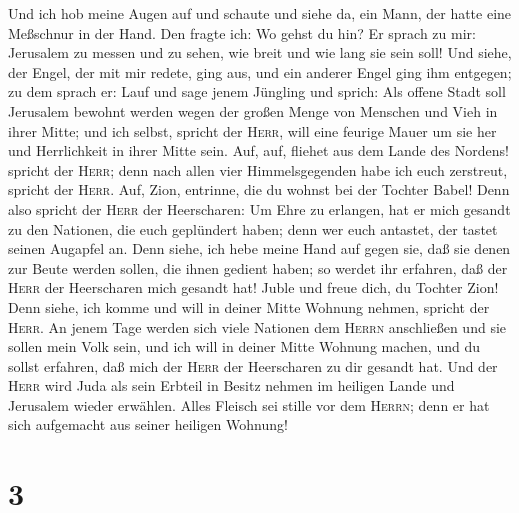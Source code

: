  Und ich hob meine Augen auf und schaute und siehe da, ein
Mann, der hatte eine Meßschnur in der Hand.  Den fragte
ich: Wo gehst du hin? Er sprach zu mir: Jerusalem zu messen und zu
sehen, wie breit und wie lang sie sein soll!  Und siehe,
der Engel, der mit mir redete, ging aus, und ein anderer Engel ging ihm
entgegen;  zu dem sprach er: Lauf und sage jenem Jüngling
und sprich: Als offene Stadt soll Jerusalem bewohnt werden wegen der
großen Menge von Menschen und Vieh in ihrer Mitte;  und
ich selbst, spricht der \textsc{Herr}, will eine feurige Mauer um sie
her und Herrlichkeit in ihrer Mitte sein.  Auf, auf,
fliehet aus dem Lande des Nordens! spricht der \textsc{Herr}; denn nach
allen vier Himmelsgegenden habe ich euch zerstreut, spricht der
\textsc{Herr}.  Auf, Zion, entrinne, die du wohnst bei der
Tochter Babel!  Denn also spricht der \textsc{Herr} der
Heerscharen: Um Ehre zu erlangen, hat er mich gesandt zu den Nationen,
die euch geplündert haben; denn wer euch antastet, der tastet seinen
Augapfel an.  Denn siehe, ich hebe meine Hand auf gegen
sie, daß sie denen zur Beute werden sollen, die ihnen gedient haben; so
werdet ihr erfahren, daß der \textsc{Herr} der Heerscharen mich gesandt
hat!  Juble und freue dich, du Tochter Zion! Denn siehe,
ich komme und will in deiner Mitte Wohnung nehmen, spricht der
\textsc{Herr}.  An jenem Tage werden sich viele Nationen
dem \textsc{Herrn} anschließen und sie sollen mein Volk sein, und ich
will in deiner Mitte Wohnung machen, und du sollst erfahren, daß mich
der \textsc{Herr} der Heerscharen zu dir gesandt hat. 
Und der \textsc{Herr} wird Juda als sein Erbteil in Besitz nehmen im
heiligen Lande und Jerusalem wieder erwählen.  Alles
Fleisch sei stille vor dem \textsc{Herrn}; denn er hat sich aufgemacht
aus seiner heiligen Wohnung!

\hypertarget{section-2}{%
\section{3}\label{section-2}}


